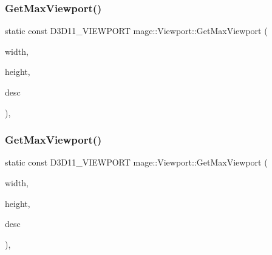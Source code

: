 \subsubsection{\texorpdfstring{Get\+Max\+Viewport()}{GetMaxViewport()}\hspace{0.1cm}{\footnotesize\ttfamily [4/5]}}
{\footnotesize\ttfamily static const D3\+D11\+\_\+\+V\+I\+E\+W\+P\+O\+RT mage\+::\+Viewport\+::\+Get\+Max\+Viewport (\begin{DoxyParamCaption}\item[{\hyperlink{namespacemage_a41c104c036fba3756a74e19f793eeaa1}{U32}}]{width,  }\item[{\hyperlink{namespacemage_a41c104c036fba3756a74e19f793eeaa1}{U32}}]{height,  }\item[{\hyperlink{namespacemage_a86cd40b8f2f42ca4d616cc6ec665a7f2}{A\+A\+Descriptor}}]{desc }\end{DoxyParamCaption})\hspace{0.3cm}{\ttfamily [static]}, {\ttfamily [noexcept]}}

\hypertarget{classmage_1_1_viewport_aa217e71e22be17179f6e1e9e18b30b77}{}\label{classmage_1_1_viewport_aa217e71e22be17179f6e1e9e18b30b77} 
\subsubsection{\texorpdfstring{Get\+Max\+Viewport()}{GetMaxViewport()}\hspace{0.1cm}{\footnotesize\ttfamily [5/5]}}
{\footnotesize\ttfamily static const D3\+D11\+\_\+\+V\+I\+E\+W\+P\+O\+RT mage\+::\+Viewport\+::\+Get\+Max\+Viewport (\begin{DoxyParamCaption}\item[{\hyperlink{namespacemage_aa97e833b45f06d60a0a9c4fc22ae02c0}{F32}}]{width,  }\item[{\hyperlink{namespacemage_aa97e833b45f06d60a0a9c4fc22ae02c0}{F32}}]{height,  }\item[{\hyperlink{namespacemage_a86cd40b8f2f42ca4d616cc6ec665a7f2}{A\+A\+Descriptor}}]{desc }\end{DoxyParamCaption})\hspace{0.3cm}{\ttfamily [static]}, {\ttfamily [noexcept]}}

\hypertarget{classmage_1_1_viewport_a27e673433e78f5382716e670b88d2bb1}{}\label{classmage_1_1_viewport_a27e673433e78f5382716e670b88d2bb1} 
